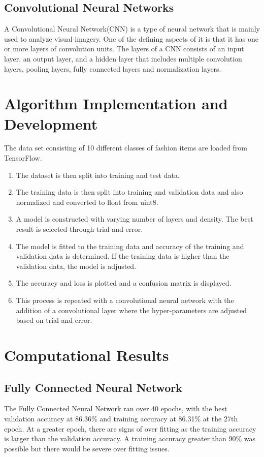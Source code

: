 \documentclass[a4paper,12pt]{article}
\begin{document}
\subsection{Convolutional Neural Networks }
	A Convolutional Neural Network(CNN) is a type of neural network that is mainly used to analyze visual imagery. One of the defining aspects of it is that it has one or more layers of convolution units. The layers of a CNN consists of an input layer, an output layer, and a hidden layer that includes multiple convolution layers, pooling layers, fully connected layers and normalization layers.
 








\section{Algorithm Implementation and Development}
The data set consisting of 10 different classes of fashion items are loaded from TensorFlow. 
\begin{enumerate}
\item The dataset is then split into training and test data.
\item The training data is then split into training and validation data and also normalized and converted to float from uint8.
\item A model is constructed with varying number of layers and density. The best result is selected through trial and error.
\item The model is fitted to the training data and accuracy of the training and validation data is determined. If the training data is higher than the validation data, the model is adjusted.
\item The accuracy and loss is plotted and a confusion matrix is displayed. 
\item This process is repeated with a convolutional neural network with the addition of a convolutional layer where the hyper-parameters are adjusted based on trial and error.

\end{enumerate}


\section{Computational Results}
\subsection{Fully Connected Neural Network}
The Fully Connected Neural Network ran over 40 epochs, with the best validation accuracy at 86.36\% and training accuracy at 86.31\% at the 27th epoch. At a greater epoch, there are signs of over fitting as the training accuracy is larger than the validation accuracy. A training accuracy greater than 90\% was possible but there would be severe over fitting issues.
\end{document}
